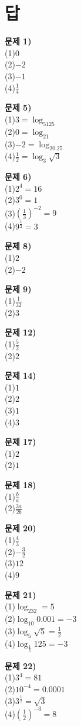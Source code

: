 \documentclass{oblivoir}
\newcommand\an[1]{\par\bigskip\noindent\textbf{문제 #1)}\\}
\let\oldsection\section
\renewcommand\section{\clearpage\oldsection}
\begin{document}
\section*{답}
\begin{minipage}{0.49\textwidth}
%
\an{1}
\noindent
(1)\:\:\(0\)\\
(2)\:\:\(-2\)\\
(3)\:\:\(-1\)\\
(4)\:\:\(\frac14\)

%
\an{5}
\noindent
(1)\:\:\(3=\log_5125\)\\
(2)\:\:\(0=\log_21\)\\
(3)\:\:\(-2=\log_20.25\)\\
(4)\:\:\(\frac12=\log_3\sqrt3\)

%
\an{6}
\noindent
(1)\:\:\(2^4=16\)\\
(2)\:\:\(3^0=1\)\\
(3)\:\:\(\left(\frac13\right)^{-2}=9\)\\
(4)\:\:\(9^{\frac12}=3\)

%
\an{8}
\noindent
(1)\:\:\(2\)\\
(2)\:\:\(-2\)

%
\an{9}
\noindent
(1)\:\:\(\frac1{32}\)\\
(2)\:\:\(3\)

%
\an{12}
\noindent
(1)\:\:\(\frac52\)\\
(2)\:\:\(2\)
\end{minipage}
\begin{minipage}{0.49\textwidth}

%
\an{14}
\noindent
(1)\:\:\(1\)\\
(2)\:\:\(2\)\\
(3)\:\:\(1\)\\
(4)\:\:\(3\)

%
\an{17}
\noindent
(1)\:\:\(2\)\\
(2)\:\:\(1\)

%
\an{18}
\noindent
(1)\:\:\(\frac ba\)\\
(2)\:\:\(\frac{3a}{2b}\)

%
\an{20}
\noindent
(1)\:\:\(\frac43\)\\
(2)\:\:\(-\frac32\)\\
(3)\:\:\(12\)\\
(4)\:\:\(9\)

%
\an{21}
\noindent
(1)\:\:\(\log_232=5\)\\
(2)\:\:\(\log_{10}0.001=-3\)\\
(3)\:\:\(\log_5\sqrt5=\frac12\)\\
(4)\:\:\(\log_{\frac15}125=-3\)

%
\an{22}
\noindent
(1)\:\:\(3^4=81\)\\
(2)\:\:\(10^{-4}=0.0001\)\\
(3)\:\:\(3^{\frac12}=\sqrt3\)\\
(4)\:\:\(\left(\frac12\right)^{-3}=8\)
\end{minipage}
\end{document}
